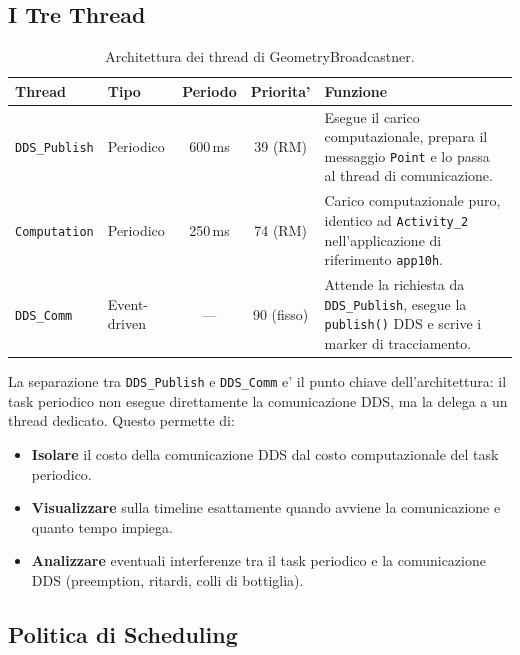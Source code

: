 \subsection{I Tre Thread}
\label{subsec:thread}

\begin{table}[htbp]
\centering
\caption{Architettura dei thread di GeometryBroadcastner.}
\label{tab:thread}
\begin{tabular}{llccp{5.5cm}}
\toprule
\textbf{Thread} & \textbf{Tipo} & \textbf{Periodo} & \textbf{Priorita'} & \textbf{Funzione} \\
\midrule
\texttt{DDS\_Publish} & Periodico & 600\,ms & 39 (RM) &
    Esegue il carico computazionale, prepara il messaggio \texttt{Point}
    e lo passa al thread di comunicazione. \\
\texttt{Computation}  & Periodico & 250\,ms & 74 (RM) &
    Carico computazionale puro, identico ad \texttt{Activity\_2}
    nell'applicazione di riferimento \texttt{app10h}. \\
\texttt{DDS\_Comm}    & Event-driven & --- & 90 (fisso) &
    Attende la richiesta da \texttt{DDS\_Publish}, esegue la
    \texttt{publish()} DDS e scrive i marker di tracciamento. \\
\bottomrule
\end{tabular}
\end{table}

La separazione tra \texttt{DDS\_Publish} e \texttt{DDS\_Comm} e' il punto
chiave dell'architettura: il task periodico non esegue direttamente la
comunicazione DDS, ma la delega a un thread dedicato. Questo permette di:
\begin{itemize}
    \item \textbf{Isolare} il costo della comunicazione DDS dal costo
          computazionale del task periodico.
    \item \textbf{Visualizzare} sulla timeline esattamente quando avviene
          la comunicazione e quanto tempo impiega.
    \item \textbf{Analizzare} eventuali interferenze tra il task periodico
          e la comunicazione DDS (preemption, ritardi, colli di bottiglia).
\end{itemize}

\subsection{Politica di Scheduling}
\label{subsec:scheduling}

